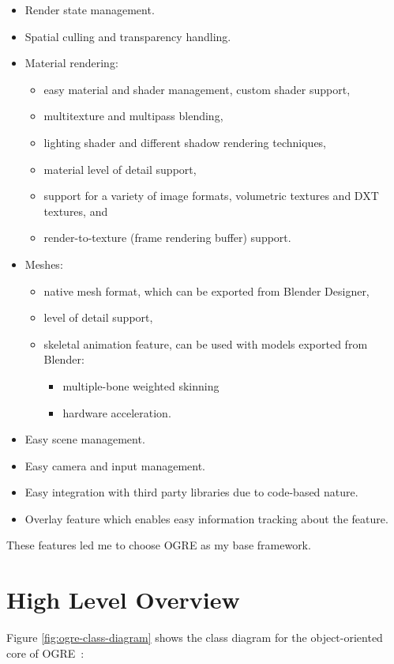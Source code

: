 \begin{itemize}
\item Render state management.
\item Spatial culling and transparency handling.
\item Material rendering:
\begin{itemize}
  \item easy material and shader management, custom shader support,
  \item multitexture and multipass blending,
  \item lighting shader and different shadow rendering techniques,
  \item material level of detail support,
  \item support for a variety of image formats, volumetric textures and DXT textures, and
  \item render-to-texture (frame rendering buffer) support.
\end{itemize}
\item Meshes:
\begin{itemize}
  \item native mesh format, which can be exported from Blender Designer,
  \item level of detail support,
  \item skeletal animation feature, can be used with models exported from Blender:
\begin{itemize}
  \item multiple-bone weighted skinning
  \item hardware acceleration.
\end{itemize}
\end{itemize}
\item Easy scene management.
\item Easy camera and input management.
\item Easy integration with third party libraries due to code-based nature.
\item Overlay feature which enables easy information tracking about the feature.
\end{itemize}

These features led me to choose OGRE as my base framework.

\section{High Level Overview}
Figure \ref{fig:ogre-class-diagram} shows the class diagram for the object-oriented core of OGRE~\cite{Moan2012}:

